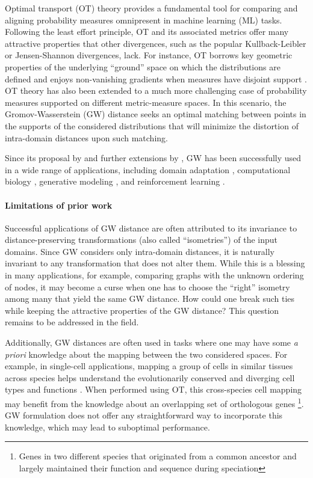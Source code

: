 Optimal transport (OT) theory provides a fundamental tool for comparing and
aligning probability measures omnipresent in machine learning (ML) tasks.
Following the least effort principle, OT and its associated metrics offer
many attractive properties that other divergences, such as the popular Kullback-Leibler or
Jensen-Shannon divergences, lack. For instance, OT borrows key geometric properties of
the underlying ``ground'' space on which the distributions are defined \citep{Villani03}
and enjoys non-vanishing gradients when measures have disjoint support \citep{Arjovsky17}.
OT theory has also been extended to a much more challenging case of probability measures supported
on different metric-measure spaces. In this scenario, the Gromov-Wasserstein (GW) distance
seeks an optimal matching between points in the supports of the considered distributions
that will minimize the distortion of intra-domain distances upon such matching.

Since its proposal by \citep{Memoli11} and further extensions by \citep{Peyre16},
GW has been successfully used in a wide range of applications, including
domain adaptation \citep{Yan18}, computational biology
\citep{Nitzan2019,Pamona,UniPort,SpaOTsc,Demetci20,Demetci22,PASTE},
generative modeling \citep{Bunne19}, and reinforcement learning \citep{GW-VAE}.

\paragraph{Limitations of prior work} Successful applications of GW distance are often
attributed to its invariance to distance-preserving transformations (also called ``isometries'')
of the input domains. Since GW considers only intra-domain distances, it is naturally invariant
to any transformation that does not alter them. While this is a blessing in many applications,
for example, comparing graphs with the unknown ordering of nodes, it may become a curse
when one has to choose the ``right'' isometry among many that yield the same GW distance.
How could one break such ties while keeping the attractive properties of the GW distance?
This question remains to be addressed in the field.

Additionally, GW distances are often used in tasks where one may have some
\textit{a priori} knowledge about the mapping between the two considered spaces.
For example, in single-cell applications, mapping a group of cells in similar tissues
across species helps understand the evolutionarily conserved and diverging cell types
and functions \citep{kriebel2022uinmf}. When performed using OT, this cross-species cell mapping
may benefit from the knowledge about an overlapping set of orthologous genes
\footnote {Genes in two different species that originated from a common ancestor and
largely maintained their function and sequence during speciation}.
GW formulation does not offer any straightforward way to incorporate this knowledge,
which may lead to suboptimal performance.

